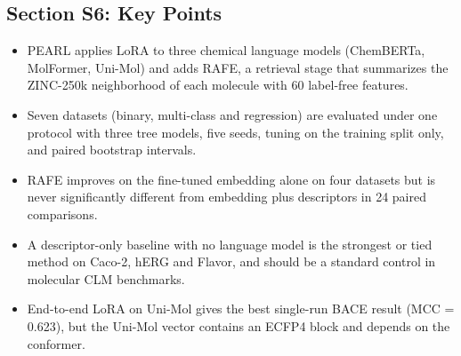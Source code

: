 \documentclass[9pt,a4paper]{article}
\begin{document}
\subsection*{Section S6: Key Points}

\begin{itemize}
\item PEARL applies LoRA to three chemical language models (ChemBERTa, MolFormer, Uni-Mol) and adds RAFE, a retrieval stage that summarizes the ZINC-250k neighborhood of each molecule with 60 label-free features.
\item Seven datasets (binary, multi-class and regression) are evaluated under one protocol with three tree models, five seeds, tuning on the training split only, and paired bootstrap intervals.
\item RAFE improves on the fine-tuned embedding alone on four datasets but is never significantly different from embedding plus descriptors in 24 paired comparisons.
\item A descriptor-only baseline with no language model is the strongest or tied method on Caco-2, hERG and Flavor, and should be a standard control in molecular CLM benchmarks.
\item End-to-end LoRA on Uni-Mol gives the best single-run BACE result (MCC = 0.623), but the Uni-Mol vector contains an ECFP4 block and depends on the conformer.
\end{itemize}



\end{document}
